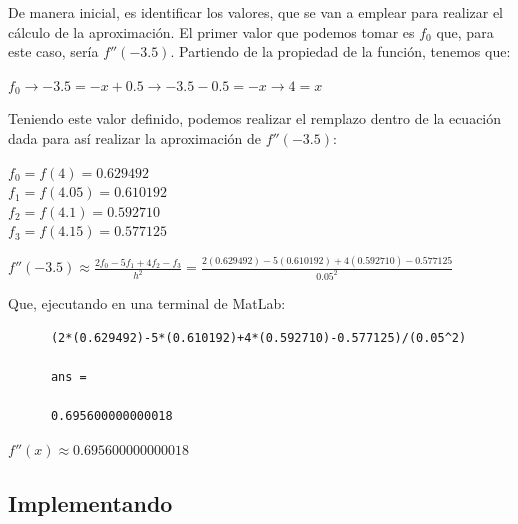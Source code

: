 \documentclass[english,notitlepage,letterpaper, 10pt]{article} %
\begin{document}
\begin{enumerate}
    De manera inicial, es identificar los valores, que se van a emplear para realizar el cálculo de la aproximación. El primer valor que podemos tomar es $f_0$ que, para este caso, sería $f''(-3.5)$. Partiendo de la propiedad de la función, tenemos que:

    \begin{center}
      \begin{math}
        f_0 \rightarrow -3.5 = -x + 0.5 \rightarrow -3.5 - 0.5 = -x \rightarrow 4 = x
      \end{math}
    \end{center}


    Teniendo este valor definido, podemos realizar el remplazo dentro de la ecuación dada para así realizar la aproximación de $f''(-3.5)$:

    \begin{center}
      $f_0 = f(4) = 0.629492 $ \\
      $f_1 = f(4.05) = 0.610192 $ \\
      $f_2 = f(4.1) = 0.592710 $ \\
      $f_3 = f(4.15) = 0.577125 $ \\
    \end{center}

    \begin{center}
      \begin{math}
        f''(-3.5) \approx \displaystyle \frac{2f_0-5f_1+4f_2-f_3}{h^2} = \frac{2(0.629492)-5(0.610192)+4(0.592710)-0.577125}{0.05^2}
      \end{math}
    \end{center}

    Que, ejecutando en una terminal de MatLab:

    \begin{lstlisting}
      (2*(0.629492)-5*(0.610192)+4*(0.592710)-0.577125)/(0.05^2) 

      ans =
      
      0.695600000000018
    \end{lstlisting}
    
    \begin{center}
      \begin{math}
        f''(x) \approx  0.695600000000018
      \end{math}
    \end{center}

  \end{enumerate}

    \subsection{Implementando}
    
\end{document}
